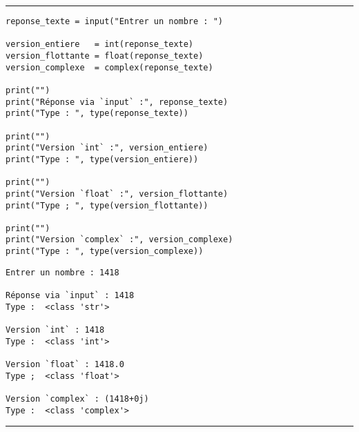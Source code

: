 \bigskip
{\hrule height .5mm}
\begin{verbatim}
reponse_texte = input("Entrer un nombre : ")

version_entiere   = int(reponse_texte)
version_flottante = float(reponse_texte)
version_complexe  = complex(reponse_texte)

print("")
print("Réponse via `input` :", reponse_texte)
print("Type : ", type(reponse_texte))

print("")
print("Version `int` :", version_entiere)
print("Type : ", type(version_entiere))

print("")
print("Version `float` :", version_flottante)
print("Type ; ", type(version_flottante))

print("")
print("Version `complex` :", version_complexe)
print("Type : ", type(version_complexe))
\end{verbatim}
 \color{ForestGreen}
\vspace{-1.5em}
\begin{verbatim}
Entrer un nombre : 1418

Réponse via `input` : 1418
Type :  <class 'str'>

Version `int` : 1418
Type :  <class 'int'>

Version `float` : 1418.0
Type ;  <class 'float'>

Version `complex` : (1418+0j)
Type :  <class 'complex'>
\end{verbatim} \color{Black}
{\hrule height .5mm}
\bigskip